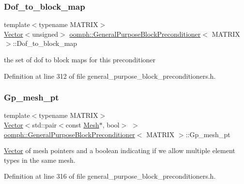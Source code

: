 \subsubsection{\texorpdfstring{Dof\+\_\+to\+\_\+block\+\_\+map}{Dof\_to\_block\_map}}
{\footnotesize\ttfamily template$<$typename M\+A\+T\+R\+IX$>$ \\
\hyperlink{classoomph_1_1Vector}{Vector}$<$unsigned$>$ \hyperlink{classoomph_1_1GeneralPurposeBlockPreconditioner}{oomph\+::\+General\+Purpose\+Block\+Preconditioner}$<$ M\+A\+T\+R\+IX $>$\+::Dof\+\_\+to\+\_\+block\+\_\+map\hspace{0.3cm}{\ttfamily [private]}}



the set of dof to block maps for this preconditioner 



Definition at line 312 of file general\+\_\+purpose\+\_\+block\+\_\+preconditioners.\+h.

\mbox{\label{classoomph_1_1GeneralPurposeBlockPreconditioner_a7d4b1aedf5b481972a3a13f6f5e06720}} 
\subsubsection{\texorpdfstring{Gp\+\_\+mesh\+\_\+pt}{Gp\_mesh\_pt}}
{\footnotesize\ttfamily template$<$typename M\+A\+T\+R\+IX$>$ \\
\hyperlink{classoomph_1_1Vector}{Vector}$<$std\+::pair$<$const \hyperlink{classoomph_1_1Mesh}{Mesh}$\ast$, bool$>$ $>$ \hyperlink{classoomph_1_1GeneralPurposeBlockPreconditioner}{oomph\+::\+General\+Purpose\+Block\+Preconditioner}$<$ M\+A\+T\+R\+IX $>$\+::Gp\+\_\+mesh\+\_\+pt\hspace{0.3cm}{\ttfamily [private]}}

\hyperlink{classoomph_1_1Vector}{Vector} of mesh pointers and a boolean indicating if we allow multiple element types in the same mesh. 

Definition at line 316 of file general\+\_\+purpose\+\_\+block\+\_\+preconditioners.\+h.

\mbox{\label{classoomph_1_1GeneralPurposeBlockPreconditioner_a5c29b06a7668e63309cfe27efdf1a60a}} 
